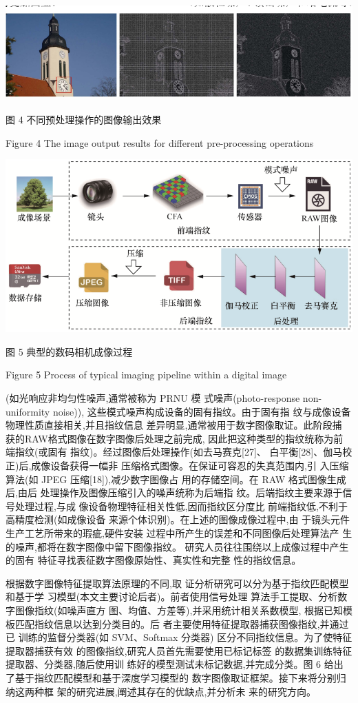 \documentclass{article}
\begin{document}
\includegraphics{_page_4_Picture_6.png}


图 4 不同预处理操作的图像输出效果

Figure 4 The image output results for different pre-processing operations


\includegraphics{_page_4_Figure_10.png}


图 5 典型的数码相机成像过程

Figure 5 Process of typical imaging pipeline within a digital image

(如光响应非均匀性噪声,通常被称为 PRNU 模 式噪声(photo-response non-uniformity noise)), 这些模式噪声构成设备的固有指纹。由于固有指 纹与成像设备物理性质直接相关,并且指纹信息 差异明显,通常被用于数字图像取证。此阶段捕 获的RAW格式图像在数字图像后处理之前完成, 因此把这种类型的指纹统称为前端指纹(或固有 指纹)。经过图像后处理操作(如去马赛克[27]、 白平衡[28]、伽马校正)后,成像设备获得一幅非 压缩格式图像。在保证可容忍的失真范围内,引 入压缩算法(如 JPEG 压缩[18]),减少数字图像占 用的存储空间。在 RAW 格式图像生成后,由后 处理操作及图像压缩引入的噪声统称为后端指 纹。后端指纹主要来源于信号处理过程,与成 像设备物理特征相关性低,因而指纹区分度比 前端指纹低,不利于高精度检测(如成像设备 来源个体识别)。在上述的图像成像过程中,由 于镜头元件生产工艺所带来的瑕疵,硬件安装 过程中所产生的误差和不同图像后处理算法产 生的噪声,都将在数字图像中留下图像指纹。 研究人员往往围绕以上成像过程中产生的固有 特征寻找表征数字图像原始性、真实性和完整 性的指纹信息。

根据数字图像特征提取算法原理的不同,取 证分析研究可以分为基于指纹匹配模型和基于学 习模型(本文主要讨论后者)。前者使用信号处理 算法手工提取、分析数字图像指纹(如噪声直方 图、均值、方差等),并采用统计相关系数模型, 根据已知模板匹配指纹信息以达到分类目的。后 者主要使用特征提取器捕获图像指纹,并通过已 训练的监督分类器(如 SVM、Softmax 分类器) 区分不同指纹信息。为了使特征提取器捕获有效 的图像指纹,研究人员首先需要使用已标记标签 的数据集训练特征提取器、分类器,随后使用训 练好的模型测试未标记数据,并完成分类。图 6 给出了基于指纹匹配模型和基于深度学习模型的 数字图像取证框架。接下来将分别归纳这两种框 架的研究进展,阐述其存在的优缺点,并分析未 来的研究方向。
\end{document}

